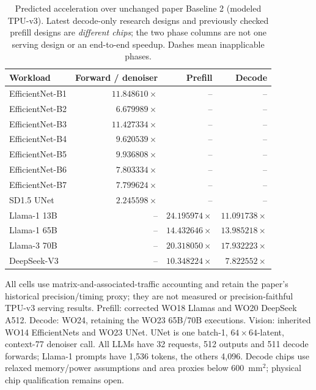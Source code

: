 \begin{table}[H]
\centering\small
\caption{Predicted acceleration over unchanged paper Baseline 2 (modeled
TPU-v3). Latest decode-only research designs and previously checked prefill
designs are \emph{different chips}; the two phase columns are not one serving
design or an end-to-end speedup. Dashes mean inapplicable phases.}
\label{tab:current_phase_speedups}
\begin{tabular}{@{}lrrr@{}}
\toprule
Workload & Forward / denoiser & Prefill & Decode \\
\midrule
EfficientNet-B1 & $11.848610\times$ & -- & -- \\
EfficientNet-B2 & $6.679989\times$ & -- & -- \\
EfficientNet-B3 & $11.427334\times$ & -- & -- \\
EfficientNet-B4 & $9.620539\times$ & -- & -- \\
EfficientNet-B5 & $9.936808\times$ & -- & -- \\
EfficientNet-B6 & $7.803334\times$ & -- & -- \\
EfficientNet-B7 & $7.799624\times$ & -- & -- \\
SD1.5 UNet & $2.245598\times$ & -- & -- \\
Llama-1 13B & -- & $24.195974\times$ & $11.091738\times$ \\
Llama-1 65B & -- & $14.432646\times$ & $13.985218\times$ \\
Llama-3 70B & -- & $20.318050\times$ & $17.932223\times$ \\
DeepSeek-V3 & -- & $10.348224\times$ & $7.822552\times$ \\
\bottomrule
\end{tabular}
\par\smallskip\begin{minipage}{\linewidth}\footnotesize
All cells use matrix-and-associated-traffic accounting and retain the paper's
historical precision/timing proxy; they are not measured or precision-faithful
TPU-v3 serving results. Prefill: corrected WO18 Llamas and WO20 DeepSeek A512.
Decode: WO24, retaining the WO23 65B/70B executions. Vision: inherited WO14
EfficientNets and WO23 UNet. UNet is one batch-1, $64\!\times\!64$-latent,
context-77 denoiser call. All LLMs have 32 requests, 512 outputs and 511 decode
forwards; Llama-1 prompts have 1,536 tokens, the others 4,096.
Decode chips use relaxed memory/power assumptions and area proxies below
600~mm$^2$; physical chip qualification remains open.
\end{minipage}
\end{table}
